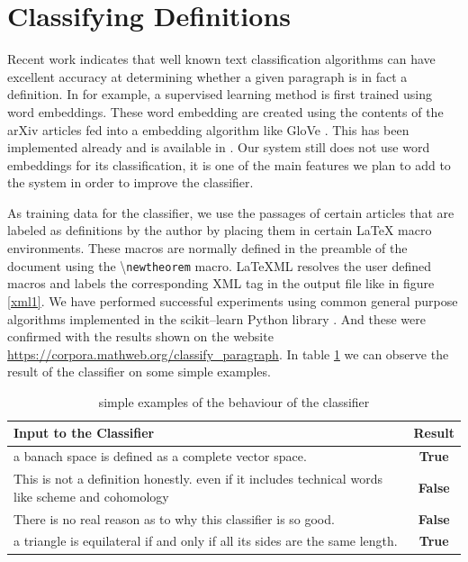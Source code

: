 \documentclass[a4paper]{easychair}
\begin{document}
\section{Classifying Definitions}
Recent work indicates that well known text classification algorithms \cite{bengio2003neural,chen2017improving} can have excellent accuracy  at determining whether a given paragraph is in fact a definition.  In \cite{webscipara} for example, a supervised learning method is first trained using word embeddings.  These word embedding are created using the contents of the arXiv articles fed into a embedding algorithm like GloVe \cite{pennington2014glove}. This has been  implemented already and is available in \cite{SML}. Our system still does not use word embeddings for its classification, it is one of the main features we plan to add to the system in order to improve the classifier.

As training data for the classifier, we use the passages of certain articles that are labeled as definitions by the author by placing them in certain \LaTeX{} macro environments. These macros are normally defined in the preamble of the document using the \textbackslash \texttt{newtheorem} macro. LaTeXML resolves the user defined macros and labels  the corresponding XML tag in the output file like in figure \ref{xml1}. We have performed successful experiments  using common general purpose algorithms implemented in the scikit--learn Python library \cite{scikit-learn}. And these were confirmed with the results shown on the website \url{https://corpora.mathweb.org/classify_paragraph}.
In table \ref{sanity} we can observe the result of the classifier on some simple examples.

\begin{table}[h]
    \begin{center}
    \begin{tabular}{|p{}|c|}
        \hline
        \hline
        \textbf{Input to the Classifier} & \textbf{Result} \\
        \hline
        \hline
        a banach space is defined as a complete vector space. & \textbf{True}\\
        \hline
        This is not a definition honestly. even if it includes technical words like scheme and cohomology & \textbf{False} \\
        \hline
        There is no real reason as to why this classifier is so good. & \textbf{False}\\
        \hline
        a triangle is equilateral if and only if all its sides are the same length. & \textbf{True}\\
        \hline
    \end{tabular}
    \caption{\label{sanity}simple examples of the behaviour of the classifier}
    \end{center} 
\end{table}
\end{document}
